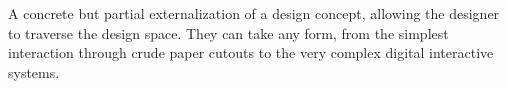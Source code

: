 \begin{tool}[Prototype] \label{tool:prototype} 
  A concrete but partial externalization of a design concept, allowing the designer to traverse the design space. They can take any form, from the simplest interaction through crude paper cutouts to the very complex digital interactive systems.  \cite[p. 7:4]{lim} \cite[p. 175]{benyon14}
\end{tool}